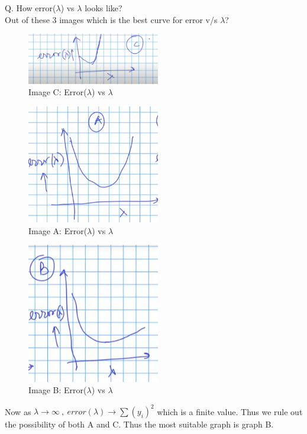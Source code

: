 \documentclass[11pt, twosides]{article}
\begin{document}
\begin{flushleft}
Q. How error($\lambda$) vs $\lambda$ looks like?\\
Out of these 3 images which is the best curve for error v/s $\lambda$?
\color{blue}

\begin{figure}[h]
    \centering
    \includegraphics[width = 5.8cm]{image_C.PNG}
    \caption{Image C: Error($\lambda$) vs $\lambda$}
\end{figure}
\newpage
\begin{figure}[h]
    \centering
    \includegraphics[width = 5.8cm]{image_A.PNG}
    \caption{Image A: Error($\lambda$) vs $\lambda$}
\end{figure}
\begin{figure}[h]
    \centering
    \includegraphics[width = 5.8cm]{image_B.PNG}
    \caption{Image B: Error($\lambda$) vs $\lambda$}
\end{figure}

Now as $\lambda \rightarrow \infty \ , \ error(\lambda) \rightarrow \sum (y_i)^2$ which is a finite value. Thus we rule out the possibility of both A and C. Thus the most suitable graph is graph B.


\end{flushleft}
\end{document}
